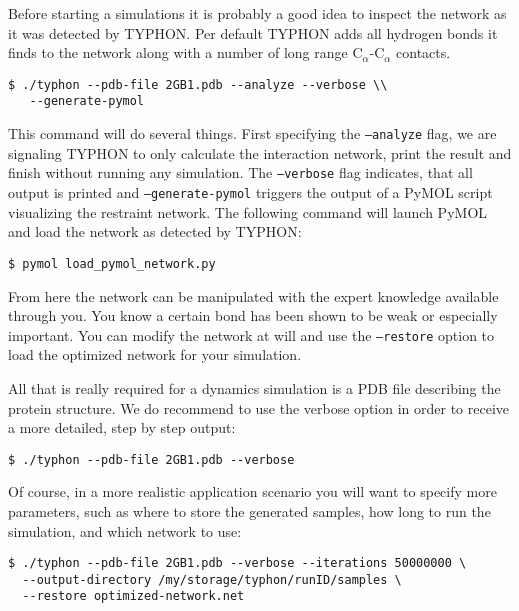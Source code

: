 \noindent Before starting a simulations it is probably a good idea to
inspect the network as it was detected by TYPHON. Per default TYPHON
adds all hydrogen bonds it finds to the network along with a number of
long range $\mathrm{C}_\alpha$-$\mathrm{C}_\alpha$ contacts.

\begin{verbatim}
$ ./typhon --pdb-file 2GB1.pdb --analyze --verbose \\
   --generate-pymol 
\end{verbatim}

\noindent This command will do several things. First specifying the
\texttt{--analyze} flag, we are signaling TYPHON to only calculate the
interaction network, print the result and finish without running any
simulation. The \texttt{--verbose} flag indicates, that all output is
printed and \texttt{--generate-pymol} triggers the output of a PyMOL
script visualizing the restraint network. The following command will
launch PyMOL and load the network as detected by TYPHON:

\begin{verbatim}
$ pymol load_pymol_network.py 
\end{verbatim}

\noindent From here the network can be manipulated with the expert
knowledge available through you. You know a certain bond has been
shown to be weak or especially important. You can modify the network
at will and use the \texttt{--restore} option to load the optimized
network for your simulation.

All that is really required for a dynamics simulation is a PDB file describing the protein 
structure. We do recommend to use the verbose option in order to receive a more detailed,
step by step output:

\begin{verbatim}
$ ./typhon --pdb-file 2GB1.pdb --verbose 
\end{verbatim}

Of course, in a more realistic application scenario you will want to specify more 
parameters, such as where to store the generated samples, how long to run the simulation, 
and which network to use:
 
\begin{verbatim}
$ ./typhon --pdb-file 2GB1.pdb --verbose --iterations 50000000 \
  --output-directory /my/storage/typhon/runID/samples \
  --restore optimized-network.net
\end{verbatim}


